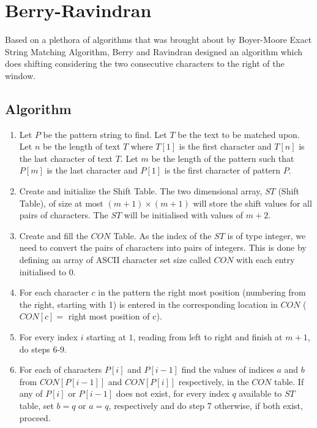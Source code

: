 \section{Berry-Ravindran}			%
Based on a plethora of algorithms that was brought about by Boyer-Moore Exact String Matching Algorithm, Berry and Ravindran designed an algorithm which does shifting considering the two consecutive characters to the right of the window.
\subsection{Algorithm}
\begin{enumerate}
\item Let $P$ be the pattern string to find. Let $T$ be the text to be matched upon. Let $n$ be the length of text $T$ where $T[1]$ is the first character and $T[n]$ is the last character of text $T$. Let $m$ be the length of the pattern such that $P[m]$ is the last character and $P[1]$ is the first character of pattern $P$.

\item Create and initialize the Shift Table. The two dimensional array, $ST$ (Shift Table), of size at most $(m+1)\times(m+1)$ will store the shift values for all pairs of characters. The $ST$ will be initialised with values of $m+2$.

\item Create and fill the $CON$ Table. As the index of the $ST$ is of type integer, we need to convert the pairs of characters into pairs of integers. This is done by defining an array of ASCII character set size called $CON$ with each entry initialised to $0$.

\item For each character $c$ in the pattern the right most position (numbering from the right, starting with 1) is entered in the corresponding location in $CON$ ($CON[c]=$ right most position of c).

\item For every index $i$ starting at $1$, reading from left to right and finish at $m+1$, do steps 6-9.

	\item For each of characters $P[i]$ and $P[i-1]$ find the values of indices $a$ and $b$ from $CON[P[i-1]]$ and $CON[P[i]]$ respectively, in the $CON$ table. If any of $P[i]$ or $P[i-1]$ does not exist, for every index $q$ available to $ST$ table, set $b=q$ or $a=q$, respectively and do step 7 otherwise, if both exist, proceed.


\end{enumerate}
